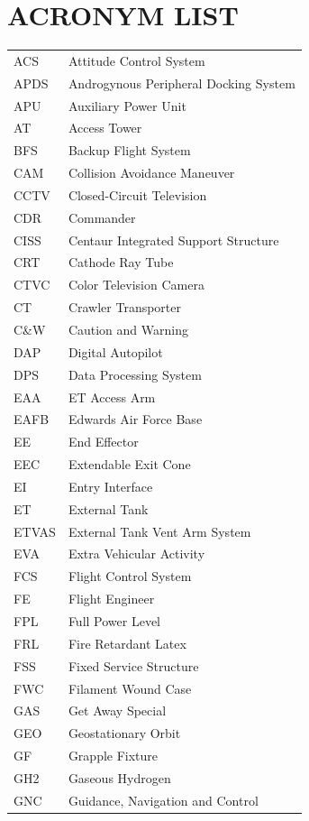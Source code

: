\documentclass[Space_Shuttle_Vessel_Manual.tex]{subfiles}
\begin{document}
\section{ACRONYM LIST}
\label{sec:acronym-list}
\noindent
\begin{longtable}{l l }
ACS & Attitude Control System\\
APDS & Androgynous Peripheral Docking System\\
APU & Auxiliary Power Unit\\
AT & Access Tower\\
BFS & Backup Flight System\\
CAM & Collision Avoidance Maneuver\\
CCTV & Closed-Circuit Television\\
CDR & Commander\\
CISS & Centaur Integrated Support Structure\\
CRT & Cathode Ray Tube\\
CTVC & Color Television Camera\\
CT & Crawler Transporter\\
C\&W & Caution and Warning\\
DAP & Digital Autopilot\\
DPS & Data Processing System\\
EAA & ET Access Arm\\
EAFB & Edwards Air Force Base\\
EE & End Effector\\
EEC & Extendable Exit Cone\\
EI & Entry Interface\\
ET & External Tank\\
ETVAS & External Tank Vent Arm System\\
EVA & Extra Vehicular Activity\\
FCS & Flight Control System\\
FE & Flight Engineer\\
FPL & Full Power Level\\
FRL & Fire Retardant Latex\\
FSS & Fixed Service Structure\\
FWC & Filament Wound Case\\
GAS & Get Away Special\\
GEO & Geostationary Orbit\\
GF & Grapple Fixture\\
GH2 & Gaseous Hydrogen\\
GNC & Guidance, Navigation and Control\\

\end{longtable}
\end{document}
